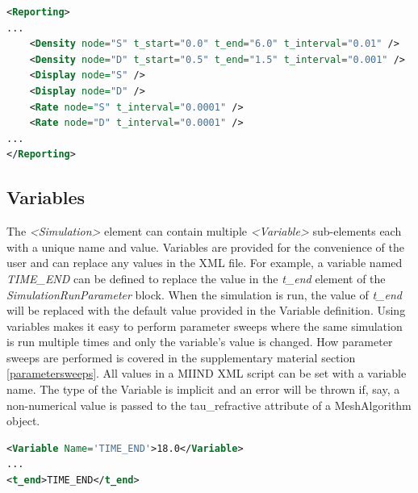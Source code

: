 \documentclass[utf8]{frontiersSCNS} %
\begin{document}
\begin{lstlisting}[language=xml,caption={A set of reporting definitions to record the probability densities and rates of two populations, S and D. The densities will also be displayed during simulation.}]
<Reporting>
...
	<Density node="S" t_start="0.0" t_end="6.0" t_interval="0.01" />
	<Density node="D" t_start="0.5" t_end="1.5" t_interval="0.001" />
	<Display node="S" />
	<Display node="D" />
	<Rate node="S" t_interval="0.0001" />
	<Rate node="D" t_interval="0.0001" />
...
</Reporting>
\end{lstlisting}

\subsection{Variables}
\label{variables}
The \textit{\textless Simulation\textgreater} element can contain multiple \textit{\textless Variable\textgreater} sub-elements each with a unique name and value. Variables are provided for the convenience of the user and can replace any values in the XML file. For example, a variable named \textit{TIME\_END} can be defined to replace the value in the \textit{t\_end} element of the \textit{SimulationRunParameter} block. When the simulation is run, the value of \textit{t\_end} will be replaced with the default value provided in the Variable definition. Using variables makes it easy to perform parameter sweeps where the same simulation is run multiple times and only the variable's value is changed. How parameter sweeps are performed is covered in the supplementary material section \ref{parametersweeps}.
All values in a MIIND XML script can be set with a variable name. The type of the Variable is implicit and an error will be thrown if, say, a non-numerical value is passed to the tau\_refractive attribute of a MeshAlgorithm object.\\

\begin{lstlisting}[language=xml,caption={A Variable definition. TIME\_END has a default value of 18.0 and is used in the \textit{t\_end} parameter definition.}]
<Variable Name='TIME_END'>18.0</Variable>
...
<t_end>TIME_END</t_end>
\end{lstlisting}
\end{document}
